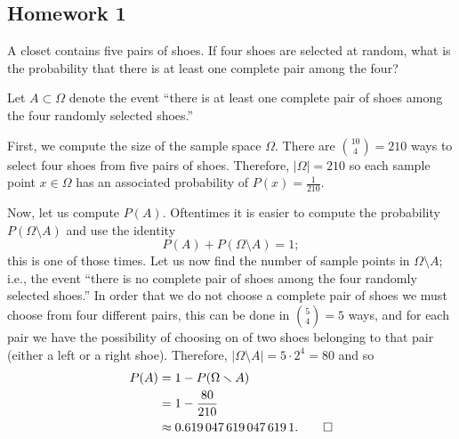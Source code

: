 \subsection{Homework 1}
\begin{problem}[Handout 1, \# 5]
  A closet contains five pairs of shoes. If four shoes are selected at
  random, what is the probability that there is at least one complete pair
  among the four?
\end{problem}
\begin{solution*}
  Let \(A\subset\Omega\) denote the event ``there is at least one complete
  pair of shoes among the four randomly selected shoes.''

  First, we compute the size of the sample space \(\Omega\). There are
  \(\binom{10}{4}=210\) ways to select four shoes from five pairs of
  shoes. Therefore, \(|\Omega|=210\) so each sample point \(x\in\Omega\)
  has an associated probability of \(P(x)=\frac{1}{210}\).

  Now, let us compute \(P(A)\). Oftentimes it is easier to compute the
  probability \(P(\Omega\setminus A)\) and use the identity
  \[
    P(A)+P(\Omega\setminus A)=1;
  \]
  this is one of those times. Let us now find the number of sample points
  in \(\Omega\setminus A\); i.e., the event ``there is no complete pair of
  shoes among the four randomly selected shoes.'' In order that we do not
  choose a complete pair of shoes we must choose from four different pairs,
  this can be done in \(\binom{5}{4}=5\) ways, and for each pair we have
  the possibility of choosing on of two shoes belonging to that pair
  (either a left or a right shoe). Therefore,
  \(|\Omega\setminus A|=5\cdot 2^4=80\) and so
  \begin{align*}
    P(A)
    &=1-P(\Omega\smallsetminus A)\\
    &=1-\frac{80}{210}\\
    &\approx\num{0.6190476190476191}.\qedhere
  \end{align*}
\end{solution*}

